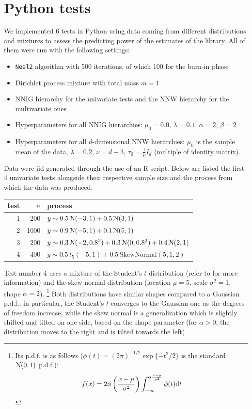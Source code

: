 \section{Python tests}\label{chap-py-test}
We implemented 6 tests in Python using data coming from different distributions and mixtures to assess the predicting power of the estimates of the library.
All of them were run with the following settings:
\begin{itemize}
	\item \verb|Neal2| algorithm with 500 iterations, of which 100 for the burn-in phase
	\item Dirichlet process mixture with total mass $m=1$
	\item NNIG hierarchy for the univariate tests and the NNW hierarchy for the multivariate ones
	\item Hyperparameters for all NNIG hierarchies: $\mu_0 = 0.0$, $\lambda = 0.1$, $\alpha = 2$, $\beta = 2$
	\item Hyperparameters for all $d$-dimensional NNW hierarchies: $\mu_0$ is the sample mean of the data, $\lambda = 0.2$, $\nu = d + 3$, $\tau_0 = \frac{1}{\nu} I_d$ (multiple of identity matrix).
\end{itemize}
Data were iid generated through the use of an R script.
Below are listed the first 4 univariate tests alongside their respective sample size and the process from which the data was produced:
\begin{center}
	\begin{tabular}{r|r|l}
		test & $n$ & process \\ \hline
		1 &  200 & $y \sim 0.5 \, \mathcal N(-3, 1) + 0.5 \, \mathcal N(3, 1)$ \\
		2 & 1000 & $y \sim 0.9 \, \mathcal N(-5, 1) + 0.1 \, \mathcal N(5, 1)$ \\
		3 &  200 & $y \sim 0.3 \, \mathcal N(-2, 0.8^2) + 0.3 \, \mathcal N(0, 0.8^2) + 0.4 \, \mathcal N(2, 1)$ \\
		4 &  400 & $y \sim 0.5 \, t_5(-5, 1 ) + 0.5 \, \text{SkewNormal}(5, 1, 2)$
	\end{tabular}
\end{center}
Test number 4 uses a mixture of the Student's $t$ distribution (refer to \label{nnig} for more information) and the skew normal distribution (location $\mu=5$, scale $\sigma^2=1$, shape $\alpha=2$). \footnote{Its p.d.f. is as follows ($\phi(t) = (2\pi)^{-1/2} \exp\{-t^2/2\}$ is the standard $\mathcal N(0,1)$ p.d.f.):
$$
f(x) = 2 \phi\left(\frac{x-\mu}{\sigma^2}\right) \int_{-\infty}^{\alpha \frac{x-\mu}{\sigma^2}} \phi(t) \mathrm d t
$$}
Both distributions have similar shapes compared to a Gaussian p.d.f.; in particular, the Student's $t$ converges to the Gaussian one as the degrees of freedom increase, while the skew normal is a generalization which is slightly shifted and tilted on one side, based on the shape parameter (for $\alpha>0$, the distribution moves to the right and is tilted towards the left). \\
